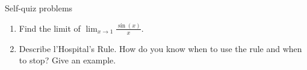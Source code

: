 \begin{frame}{Self-quiz problems}
\begin{enumerate}

\item<handout:0>	Find the limit of   $\displaystyle \lim_{x \to 1} \frac{\sin(x)}{x}$.




\item<handout:0>	Describe l'Hospital’s Rule. How do you know when to use the rule
	and when to stop? Give an example.

\end{enumerate}

\end{frame}
